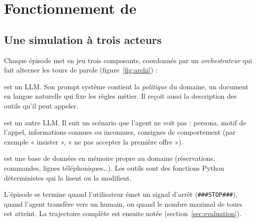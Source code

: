 \section{Fonctionnement de \texorpdfstring{\taub}{tau2-bench}}
\label{sec:benchmark}

\subsection{Une simulation à trois acteurs}

Chaque épisode met en jeu trois composants, coordonnés par un \emph{orchestrateur} qui fait alterner les tours de parole (figure~\ref{fig:archi}) :
\begin{description}[nosep]
  \item[L'agent évalué] est un LLM. Son prompt système contient la \emph{politique} du domaine, un document en langue naturelle qui fixe les règles métier. Il reçoit aussi la description des outils qu'il peut appeler.
  \item[L'utilisateur simulé] est un autre LLM. Il suit un scénario que l'agent ne voit pas : persona, motif de l'appel, informations connues ou inconnues, consignes de comportement (par exemple « insister », « ne pas accepter la première offre »).
  \item[L'environnement] est une base de données en mémoire propre au domaine (réservations, commandes, lignes téléphoniques\ldots). Les outils sont des fonctions Python déterministes qui la lisent ou la modifient.
\end{description}
L'épisode se termine quand l'utilisateur émet un signal d'arrêt (\texttt{\#\#\#STOP\#\#\#}), quand l'agent transfère vers un humain, ou quand le nombre maximal de tours est atteint. La trajectoire complète est ensuite notée (section~\ref{sec:evaluation}).

